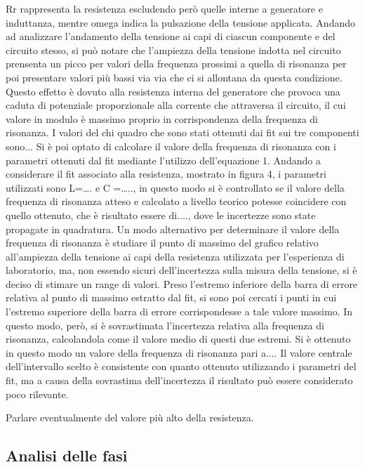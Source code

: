 Rr rappresenta la resistenza escludendo però quelle interne a generatore e induttanza, mentre omega indica la pulsazione della tensione applicata.
Andando ad analizzare l’andamento della tensione ai capi di ciascun componente e del circuito stesso, si può notare che l’ampiezza della tensione indotta nel circuito prensenta un picco per valori della frequenza prossimi a quella di risonanza per poi presentare valori più bassi via via che ci si allontana da questa condizione.
Questo effetto è dovuto alla resistenza interna del generatore che provoca una caduta di potenziale proporzionale alla corrente che attraversa il circuito, il cui valore in modulo è massimo proprio in corrispondenza della frequenza di risonanza.
I valori del chi quadro che sono stati ottenuti dai fit sui tre componenti sono...
Si è poi optato di calcolare il valore della frequenza di risonanza con i parametri ottenuti dal fit mediante l’utilizzo dell’equazione 1.
Andando a considerare il fit associato alla resistenza, mostrato in figura 4, i parametri utilizzati sono L=…. e C =….., in questo modo si è controllato se il valore della frequenza di risonanza atteso e calcolato a livello teorico potesse coincidere con quello ottenuto, che è risultato essere di...., dove le incertezze sono state propagate in quadratura.
Un modo alternativo per determinare il valore della frequenza di risonanza è studiare il punto di massimo del grafico relativo all’ampiezza della tensione ai capi della resistenza utilizzata per l’esperienza di laboratorio, ma, non essendo sicuri dell’incertezza sulla misura della tensione, si è deciso di stimare un range di valori.
Preso l’estremo inferiore della barra di errore relativa al punto di massimo estratto dal fit, si sono poi cercati i punti in cui l’estremo superiore della barra di errore corrispondesse a tale valore massimo. In questo modo, però, si è sovrastimata l’incertezza relativa alla frequenza di risonanza, calcolandola come il valore medio di questi due estremi.
Si è ottenuto in questo modo un valore della frequenza di risonanza pari a....
Il valore centrale dell’intervallo scelto è consistente con quanto ottenuto utilizzando i parametri del fit, ma a causa della sovrastima dell’incertezza il risultato può essere considerato poco rilevante.

Parlare eventualmente del valore più alto della resistenza.







\subsection{Analisi delle fasi}

